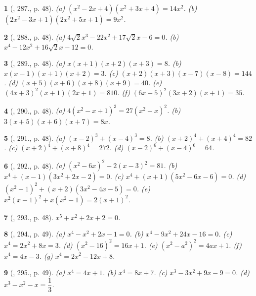 \documentclass{article}
\newtheorem{baitoan}{}
\begin{document}
\begin{baitoan}[\cite{Binh_Toan_9_tap_2}, 287., p. 48]
	(a) $(x^2 - 2x + 4)(x^2 + 3x + 4) = 14x^2$. (b) $(2x^2 - 3x + 1)(2x^2 + 5x + 1) = 9x^2$.
\end{baitoan}

\begin{baitoan}[\cite{Binh_Toan_9_tap_2}, 288., p. 48]
	(a) $4\sqrt{2}x^3 - 22x^2 + 17\sqrt{2}x - 6 = 0$. (b) $x^4 - 12x^2 + 16\sqrt{2}x - 12 = 0$.
\end{baitoan}

\begin{baitoan}[\cite{Binh_Toan_9_tap_2}, 289., p. 48]
	(a) $x(x + 1)(x + 2)(x + 3) = 8$. (b) $x(x - 1)(x + 1)(x + 2) = 3$. (c) $(x + 2)(x + 3)(x - 7)(x - 8) = 144$. (d) $(x + 5)(x + 6)(x + 8)(x + 9) = 40$. (e) $(4x + 3)^2(x + 1)(2x + 1) = 810$. (f) $(6x + 5)^2(3x + 2)(x + 1) = 35$.
\end{baitoan}

\begin{baitoan}[\cite{Binh_Toan_9_tap_2}, 290., p. 48]
	(a) $4(x^2 - x + 1)^3 = 27(x^2 - x)^2$. (b) $3(x + 5)(x + 6)(x + 7) = 8x$.
\end{baitoan}

\begin{baitoan}[\cite{Binh_Toan_9_tap_2}, 291., p. 48]
	(a) $(x - 2)^3 + (x - 4)^3 = 8$. (b) $(x + 2)^4 + (x + 4)^4 = 82$. (c) $(x + 2)^4 + (x + 8)^4 = 272$. (d) $(x - 2)^6 + (x - 4)^6 = 64$.
\end{baitoan}

\begin{baitoan}[\cite{Binh_Toan_9_tap_2}, 292., p. 48]
	(a) $(x^2 - 6x)^2 - 2(x - 3)^2 = 81$. (b) $x^4 + (x - 1)(3x^2 + 2x - 2) = 0$. (c) $x^4 + (x + 1)(5x^2 - 6x - 6) = 0$. (d) $(x^2 + 1)^2 + (x + 2)(3x^2 - 4x - 5) = 0$. (e) $x^2(x - 1)^2 + x(x^2 - 1) = 2(x + 1)^2$.
\end{baitoan}

\begin{baitoan}[\cite{Binh_Toan_9_tap_2}, 293., p. 48]
	$x^5 + x^2 + 2x + 2 = 0$.
\end{baitoan}

\begin{baitoan}[\cite{Binh_Toan_9_tap_2}, 294., p. 49]
	(a) $x^4 - x^2 + 2x - 1 = 0$. (b) $x^4 - 9x^2 + 24x - 16 = 0$. (c) $x^4 = 2x^2 + 8x = 3$. (d) $(x^2 - 16)^2 = 16x + 1$. (e) $(x^2 - a^2)^2 = 4ax + 1$. (f) $x^4 = 4x - 3$. (g) $x^4 = 2x^2 - 12x + 8$.
\end{baitoan}

\begin{baitoan}[\cite{Binh_Toan_9_tap_2}, 295., p. 49]
	(a) $x^4 = 4x + 1$. (b) $x^4 = 8x + 7$. (c) $x^3 - 3x^2 + 9x - 9 = 0$. (d) $x^3 - x^2 - x = \dfrac{1}{3}$.
\end{baitoan}
\end{document}
